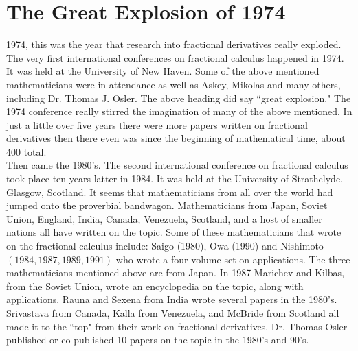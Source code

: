 \documentclass[a4paper,14pt,oneside]{book}
\theoremstyle{plain}
\theoremstyle{definition}
\theoremstyle{remark}
\begin{document}
\section{The Great Explosion of 1974}
\begin{center} 
         \begin{flushleft} 
         \justify
         \Large{
\par{1974, this was the year that research into fractional derivatives really exploded. The very first international conferences on fractional calculus happened in 1974. It was held at the University of New Haven. Some of the above mentioned mathematicians were in attendance as well as Askey, Mikolas and many others, including Dr. Thomas J. Osler. The above heading did say \textquotedblleft great explosion." The 1974 conference really stirred the imagination of many of the above mentioned. In just a little over five years there were more papers written on fractional derivatives then there even was since the beginning of mathematical time, about 400 total.\\\hspace{2cm}Then came the 1980's. The second international conference on fractional calculus took place ten years latter in 1984. It was held at the University of Strathclyde, Glasgow, Scotland. It seems that mathematicians from all over the world had jumped onto the proverbial bandwagon. Mathematicians from Japan, Soviet Union, England, India, Canada, Venezuela, Scotland, and a host of smaller nations all have written on the topic. Some of these mathematicians that wrote on the fractional calculus include: Saigo (1980), Owa (1990) and Nishimoto $(1984, 1987, 1989, 1991)$ who wrote a four-volume set on applications. The three mathematicians mentioned above are from Japan. In 1987 Marichev and Kilbas, from the Soviet Union, wrote an encyclopedia on the topic, along with applications. Rauna and Sexena from India wrote several papers in the 1980's. Srivastava from Canada, Kalla from Venezuela, and McBride from Scotland all made it to the \textquotedblleft top" from their work on fractional derivatives. Dr. Thomas Osler published or co-published 10 papers on the topic in the 1980's and 90's.}

}
\end{flushleft}
\end{center}
\end{document}
